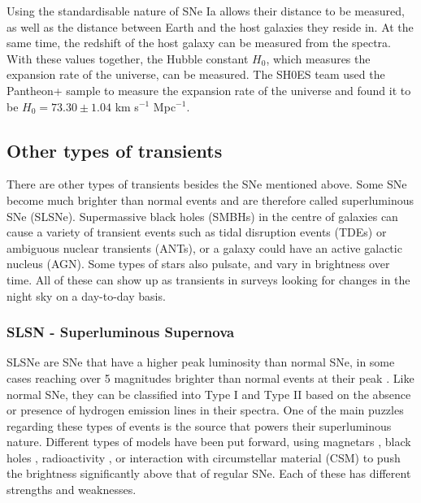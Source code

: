 \documentclass[a4paper,oneside,12pt, class=Latex/Classes/PhDthesisPSnPDF, crop=false]{standalone}
\begin{document}
Using the standardisable nature of SNe Ia allows their distance to be measured, as well as the distance between Earth and the host galaxies they reside in. At the same time, the redshift of the host galaxy can be measured from the spectra. With these values together, the Hubble constant $H_0$, which measures the expansion rate of the universe, can be measured. The SH0ES team \citep{SH0ES} used the Pantheon+ sample \citep{Pantheon+} to measure the expansion rate of the universe and found it to be $H_0 = 73.30 \pm 1.04$ km s$^{-1}$ Mpc$^{-1}$.


\subsection{Other types of transients}
\label{Other_trans}
There are other types of transients besides the SNe mentioned above. Some SNe become much brighter than normal events and are therefore called superluminous SNe (SLSNe). Supermassive black holes (SMBHs) in the centre of galaxies can cause a variety of transient events such as tidal disruption events (TDEs) or ambiguous nuclear transients (ANTs), or a galaxy could have an active galactic nucleus (AGN). Some types of stars also pulsate, and vary in brightness over time. All of these can show up as transients in surveys looking for changes in the night sky on a day-to-day basis.


\subsubsection{SLSN - Superluminous Supernova}
SLSNe are SNe that have a higher peak luminosity than normal SNe, in some cases reaching over 5 magnitudes brighter than normal events at their peak \citep{SLSN_Gal-Yam}. Like normal SNe, they can be classified into Type I and Type II based on the absence or presence of hydrogen emission lines in their spectra. One of the main puzzles regarding these types of events is the source that powers their superluminous nature. Different types of models have been put forward, using magnetars \citep{Maeda_SLSN_magentar}, black holes \citep{SLSN_BH}, radioactivity \citep{Kasen_SLSN_pair_instab}, or interaction with circumstellar material (CSM) \citep{Late-time_CSM_SLSNE_I} to push the brightness significantly above that of regular SNe. Each of these has different strengths and weaknesses.
\end{document}
